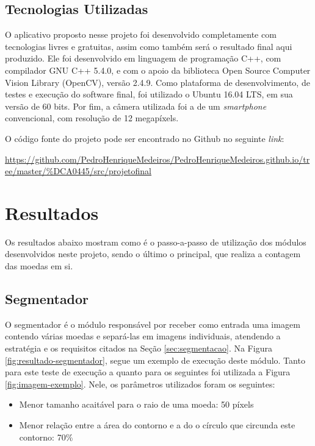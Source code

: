 \documentclass[10pt,journal]{IEEEtran}
\begin{document}
\subsection{Tecnologias Utilizadas}
\label{sec:tecnologias-envolvidas}

O aplicativo proposto nesse projeto foi desenvolvido completamente com tecnologias livres e gratuitas, assim como também será o resultado final aqui produzido. Ele foi desenvolvido em linguagem de programação C++, com compilador GNU C++ 5.4.0, e com o apoio da biblioteca Open Source Computer Vision Library (OpenCV), versão 2.4.9. Como plataforma de desenvolvimento, de testes e execução do software final, foi utilizado o Ubuntu 16.04 LTS, em sua versão de 60 bits. Por fim, a câmera utilizada foi a de um \textit{smartphone} convencional, com resolução de 12 megapíxels.

O código fonte do projeto pode ser encontrado no Github no seguinte \textit{link}:

\url{https://github.com/PedroHenriqueMedeiros/PedroHenriqueMedeiros.github.io/tree/master/%DCA0445/src/projetofinal}

\section{Resultados}
\label{sec:resultados}

Os resultados  abaixo mostram como é o passo-a-passo de utilização dos módulos desenvolvidos neste projeto, sendo o último o principal, que realiza a contagem das moedas em si. 

\subsection{Segmentador}
\label{sec:segmentador}

O segmentador é o módulo responsável por receber como entrada uma imagem contendo várias moedas e separá-las em imagens individuais, atendendo a estratégia e os requisitos citados na Seção \ref{sec:segmentacao}. Na Figura \ref{fig:resultado-segmentador}, segue um exemplo de execução deste módulo. Tanto para este teste de execução a quanto para os seguintes foi utilizada a Figura \ref{fig:imagem-exemplo}. Nele, os parâmetros utilizados foram os seguintes:

\begin{itemize}  
\item Menor tamanho acaitável para o raio de uma moeda: 50 píxels
\item Menor relação entre a área do contorno e a do o círculo que circunda este contorno: 70\%
\end{itemize}
\end{document}
